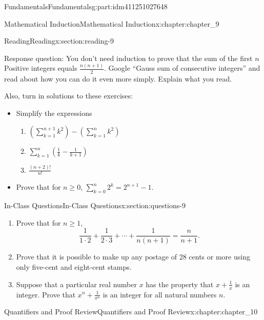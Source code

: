 \documentclass[oneside,10pt,]{book}
\numberwithin{equation}{section}
\begin{document}
\begin{partptx}{Fundamentals}{}{Fundamentals}{}{}{g:part:idm411251027648}
\begin{chapterptx}{Mathematical Induction}{}{Mathematical Induction}{}{}{x:chapter:chapter_9}
\begin{sectionptx}{Reading}{}{Reading}{}{}{x:section:reading-9}
\par
Response question: You don’t need induction to prove that the sum of the first \(n\) Positive integers equals \(\frac{n(n+1)}{2}\). Google “Gauss sum of consecutive integers” and read about how you can do it even more simply. Explain what you read.%
\par
Also, turn in solutions to these exercises:%
\begin{itemize}[label=\textbullet]
\item{}Simplify the expressions%
\begin{enumerate}[label=(\alph*)]
\item{}\((\sum_{k=1}^{n+1}k^2) -(\sum_{k=1}^n k^2)\)%
\item{}\(\sum_{k=1}^n (\frac{1}{k}-\frac{1}{k+1})\)%
\item{}\(\frac{(n+2)!}{n!}\)%
\end{enumerate}
%
\item{}Prove that for \(n \ge 0\), \(\sum_{k=0}^n {2^k} = 2^{n+1}-1\).%
\end{itemize}
%
\end{sectionptx}
%
%
\typeout{************************************************}
\typeout{************************************************}
%
\begin{sectionptx}{In-Class Questions}{}{In-Class Questions}{}{}{x:section:questions-9}
%
\begin{enumerate}[label=\arabic*.]
\item{}Prove that for \(n\geq 1\),%
\begin{equation*}
\frac{1}{1\cdot 2 }+ \frac{1}{2\cdot 3}+ \cdots  + \frac{1}{n(n+1)}= \frac{n}{n+1}.
\end{equation*}
%
\item\hypertarget{x:li:stamp-problem}{}Prove that it is possible to make up any postage of 28 cents or more using only five-cent and eight-cent stamps.%
\item{}Suppose that a particular real number \(x\) has the property that \(x + \frac{1}{x}\) is an integer.  Prove that \(x^n + \frac{1}{x^n}\) is an integer for all natural numbers \(n\).%
\end{enumerate}
%
\end{sectionptx}
\end{chapterptx}
%
\typeout{************************************************}
\typeout{************************************************}
%
\begin{chapterptx}{Quantifiers and Proof Review}{}{Quantifiers and Proof Review}{}{}{x:chapter:chapter_10}

\end{chapterptx}
\end{partptx}
\end{document}
